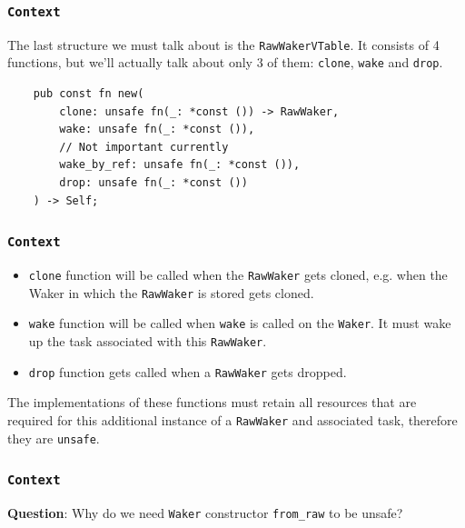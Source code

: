 \documentclass[aspectratio=1610,t]{beamer}
\begin{document}

\begin{frame}[fragile]
\frametitle{\texttt{Context}}
The last structure we must talk about is the \texttt{RawWakerVTable}. It consists of 4 functions, but we'll actually talk about only 3 of them: \texttt{clone}, \texttt{wake} and \texttt{drop}.

\begin{verbatim}
    pub const fn new(
        clone: unsafe fn(_: *const ()) -> RawWaker,
        wake: unsafe fn(_: *const ()),
        // Not important currently
        wake_by_ref: unsafe fn(_: *const ()),
        drop: unsafe fn(_: *const ())
    ) -> Self;
\end{verbatim}
\end{frame}


\begin{frame}[fragile]
\frametitle{\texttt{Context}}
\begin{itemize}
    \item \texttt{clone} function will be called when the \texttt{RawWaker} gets cloned, e.g. when the Waker in which the \texttt{RawWaker} is stored gets cloned.
    \item \texttt{wake} function will be called when \texttt{wake} is called on the \texttt{Waker}. It must wake up the task associated with this \texttt{RawWaker}.
    \item \texttt{drop} function gets called when a \texttt{RawWaker} gets dropped.
\end{itemize}

The implementations of these functions must retain all resources that are required for this additional instance of a \texttt{RawWaker} and associated task, therefore they are \texttt{unsafe}.
\end{frame}


\begin{frame}[fragile]
\frametitle{\texttt{Context}}
\textbf{Question}: Why do we need \texttt{Waker} constructor \texttt{from\_raw} to be unsafe?



\end{frame}
\end{document}
